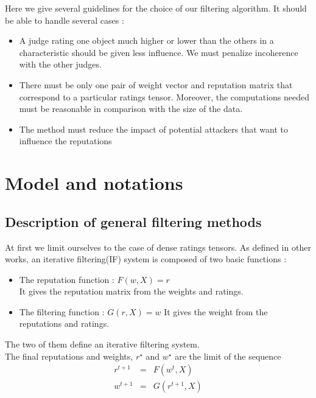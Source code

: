 \documentclass[12pt,a4paper]{article}
\begin{document}
Here we give several guidelines for the choice of our filtering algorithm. It should be able to handle several cases :
\begin{itemize}
\item A judge rating one object much higher or lower than the others in a characteristic should be given less influence. We must penalize incoherence with the other judges.
\item There must be only one pair of weight vector and reputation matrix that correspond to a particular ratings tensor. Moreover, the computations needed must be reasonable in comparison with the size of the data.
\item The method must reduce the impact of potential attackers that want to influence the reputations
\end{itemize}

\section{Model and notations}


\subsection{Description of general filtering methods}
At first we limit ourselves to the case of dense ratings tensors.
As defined in other works, an iterative filtering(IF) system is composed of two basic functions \cite{Cristo1} : 
\begin{itemize}
\item The reputation function : $F(w,X)=r$\\
It gives the reputation matrix from the weights and ratings.
\item The filtering function : $G(r,X)=w$
It gives the weight from the reputations and ratings.
\end{itemize}
The two of them define an iterative filtering system.\\
The final reputations and weights, $r^{\star}$ and $w^{\star}$ are the limit of the sequence 
\begin{eqnarray*}
r^{t+1} & = & F(w^t,X) \\
w^{t+1} & = & G(r^{t+1},X)
\end{eqnarray*}
\end{document}
